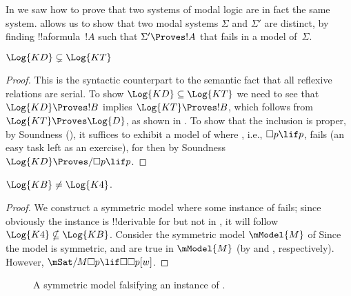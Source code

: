 \documentclass[../../../include/open-logic-section]{subfiles}
\begin{document}


In  we saw how to prove that two systems of modal
logic are in fact the same system.  allows
us to show that two modal systems $\Sigma$ and $\Sigma'$ are distinct,
by finding !!a{formula}~$!A$ such that $\Sigma' \Proves !A$ that fails in
a model of~$\Sigma$.

\begin{prop}
  $\Log{KD} \subsetneq \Log{KT}$
\end{prop}

\begin{proof} This is the syntactic counterpart to the semantic fact
  that all reflexive relations are serial. To show $\Log{KD} \subseteq
  \Log{KT}$ we need to see that $\Log{KD} \Proves !B$ implies
  $\Log{KT} \Proves !B$, which follows from $\Log{KT} \Proves
  \Log{D}$, as shown in
  .  To show
  that the inclusion is proper, by Soundness
  (), it suffices to exhibit a model of
   where , i.e., $\Box p \lif p$, fails (an
  easy task left as an exercise), for then by Soundness $\Log{KD}
  \Proves/ \Box p \lif p$.
\end{proof}

\begin{prop}
  $\Log{KB} \neq \Log{K4}$. 
\end{prop}

\begin{proof}
  We construct a symmetric model where some instance of  fails;
  since obviously the instance is !!{derivable} for  but not
  in , it will follow $\Log{K4} \nsubseteq \Log{KB}$.
  Consider the symmetric model $\mModel{M}$ of  Since
  the model is symmetric,  and  are true in $\mModel{M}$
  (by  and
  , respectively). However,
  $\mSat/{M}{\Box p \lif \Box\Box p}[w]$.
\end{proof}

\begin{figure}[htpb]
  \centering
  \caption{A symmetric model falsifying an instance of .}
\end{figure}
 
\end{document}
